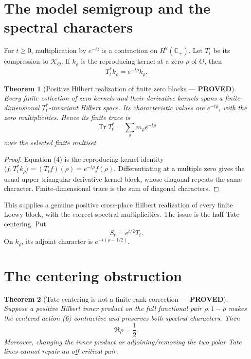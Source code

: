 \documentclass[11pt]{article}
\newcommand{\PROVED}{\textcolor{green!40!black}{\textbf{PROVED}}}
\newtheorem{theorem}{Theorem}
\begin{document}
\section{The model semigroup and the spectral characters}

For $t\ge0$, multiplication by $e^{-tz}$ is a contraction on
$H^2(\mathbb C_+)$.  Let $T_t$ be its compression to $\mathscr K_\Theta$.
If $k_\rho$ is the reproducing kernel at a zero $\rho$ of $\Theta$, then
\begin{equation}
                         T_t^*k_\rho=e^{-t\overline\rho}k_\rho.            \tag{4}
\end{equation}

\begin{theorem}[Positive Hilbert realization of finite zero blocks ---
\PROVED]
Every finite collection of zero kernels and their derivative kernels spans
a finite-dimensional $T_t^*$-invariant Hilbert space.  Its characteristic
values are $e^{-t\overline\rho}$, with the zero multiplicities.  Hence its
finite trace is
\begin{equation}
                         \operatorname{Tr}T_t^*
 =\sum_\rho m_\rho e^{-t\overline\rho}                         \tag{5}
\end{equation}
over the selected finite multiset.
\end{theorem}

\begin{proof}
Equation (4) is the reproducing-kernel identity
$\langle f,T_t^*k_\rho\rangle=(T_tf)(\rho)
=e^{-t\rho}f(\rho)$.  Differentiating at a multiple zero gives the usual
upper-triangular derivative-kernel block, whose diagonal repeats the same
character.  Finite-dimensional trace is the sum of diagonal characters.
\end{proof}

This supplies a genuine positive cross-place Hilbert realization of every
finite Loewy block, with the correct spectral multiplicities.  The issue is
the half-Tate centering.  Put
\begin{equation}
                         S_t=e^{t/2}T_t.                         \tag{6}
\end{equation}
On $k_\rho$, its adjoint character is
$e^{-t(\overline\rho-1/2)}$.

\section{The centering obstruction}

\begin{theorem}[Tate centering is not a finite-rank correction --- \PROVED]
Suppose a positive Hilbert inner product on the full functional pair
$\rho,1-\overline\rho$ makes the centered action (6) contractive and
preserves both spectral characters.  Then
\begin{equation}
                              \Re\rho=\frac12.                   \tag{7}
\end{equation}
Moreover, changing the inner product or adjoining/removing the two polar
Tate lines cannot repair an off-critical pair.
\end{theorem}
\end{document}
